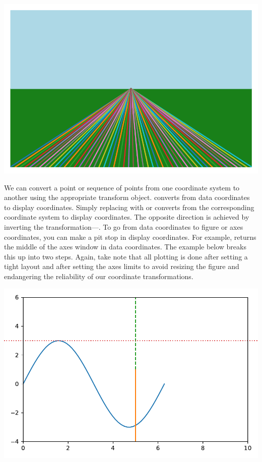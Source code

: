 \begin{center}
    \includegraphics[width = .7\textwidth]{figures/proseplots/coord-horizon.pdf}
\end{center}


We can convert a point or sequence of points from one coordinate system to another using the appropriate transform object.  converts  from data coordinates to display coordinates. Simply replacing  with  or  converts from the corresponding coordinate system to display coordinates. The opposite direction is achieved by inverting the transformation---. To go from data coordinates to figure or axes coordinates, you can make a pit stop in display coordinates. For example,   returns the middle of the axes window in data coordinates. The example below breaks this up into two steps. Again, take note that all plotting is done after setting a tight layout and after setting the axes limits to avoid resizing the figure and endangering the reliability of our coordinate transformations. 



\begin{center}
    \includegraphics[width = .7\textwidth]{figures/proseplots/coord-trans.pdf}
\end{center}

